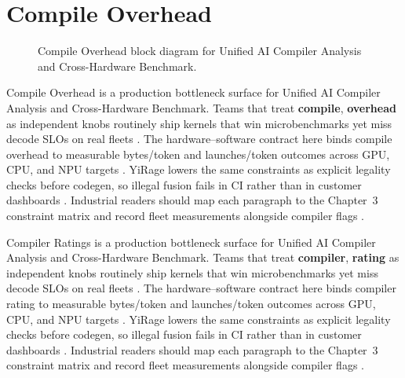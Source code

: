 \section{Compile Overhead}
\label{sec:compile_overhead}
\begin{figure}[t]
\centering
{}
\caption{Compile Overhead block diagram for Unified AI Compiler Analysis and Cross-Hardware Benchmark.}
\label{fig:compile_overhead_architecture}
\end{figure}


Compile Overhead is a production bottleneck surface for Unified AI Compiler Analysis and Cross-Hardware Benchmark. Teams that treat \textbf{compile}, \textbf{overhead} as independent knobs routinely ship kernels that win microbenchmarks yet miss decode SLOs on real fleets \citep{taxbreak2026,semianalysis2024tma}. The hardware--software contract here binds compile overhead to measurable bytes/token and launches/token outcomes across GPU, CPU, and NPU targets \citep{memoryfloor2026,amd2024xdna}. YiRage lowers the same constraints as explicit legality checks before codegen, so illegal fusion fails in CI rather than in customer dashboards \citep{nvidia2022hopper,amd2024aie}. Industrial readers should map each paragraph to the Chapter~3 constraint matrix and record fleet measurements alongside compiler flags \citep{semianalysis2024tma,dlbook}.

Compiler Ratings is a production bottleneck surface for Unified AI Compiler Analysis and Cross-Hardware Benchmark. Teams that treat \textbf{compiler}, \textbf{rating} as independent knobs routinely ship kernels that win microbenchmarks yet miss decode SLOs on real fleets \citep{liu2024deepseekv3,memoryfloor2026}. The hardware--software contract here binds compiler rating to measurable bytes/token and launches/token outcomes across GPU, CPU, and NPU targets \citep{patel2025llminference,nvidia2022hopper}. YiRage lowers the same constraints as explicit legality checks before codegen, so illegal fusion fails in CI rather than in customer dashboards \citep{taxbreak2026,semianalysis2024tma}. Industrial readers should map each paragraph to the Chapter~3 constraint matrix and record fleet measurements alongside compiler flags \citep{memoryfloor2026,amd2024xdna}.

